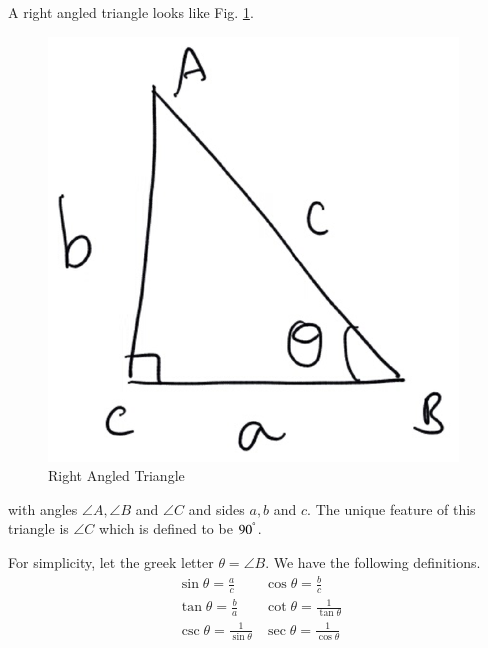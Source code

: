 
\begin{definition}
A right angled triangle looks like Fig. \ref{ch1_right}.
\begin{figure}[!h]
\begin{center}
	
\includegraphics[width=\columnwidth]{./figs/ch1_right_triangle}
\vspace*{-10cm}
\end{center}
\caption{Right Angled Triangle}
\label{ch1_right}	
\end{figure}
with angles $\angle A,\angle B$ and $\angle C$ and sides $a, b$ and $c$.  The unique feature of this triangle is $\angle C$ which is defined to be $90^{\degree}$.
\end{definition}
\begin{definition}
	For simplicity, let the greek letter $\theta = \angle B$.  We have the following definitions.
\begin{equation}
\label{ch1_trig_defs}
\begin{matrix}
	\sin \theta = \frac{a}{c} & 	\cos \theta = \frac{b}{c} \\
	\tan \theta = \frac{b}{a} & \cot \theta = \frac{1}{\tan \theta} \\
	\csc \theta = \frac{1}{\sin \theta} & \sec \theta = \frac{1}{\cos \theta}
	\end{matrix}
\end{equation}
\end{definition}

